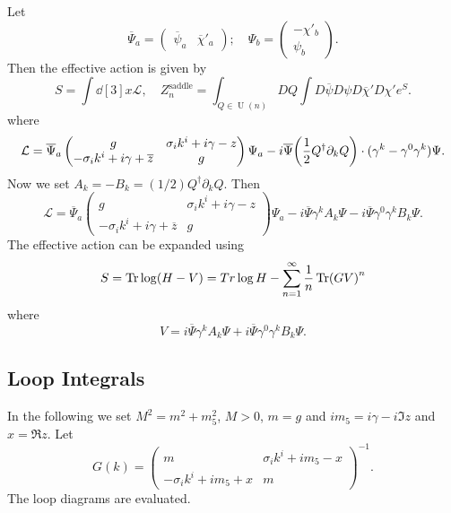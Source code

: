 \documentclass{article}
\begin{document}
Let
\[ \overline{\Psi}_a = \begin{pmatrix}
    \overline{\psi}_a & \overline{\chi}'_a
\end{pmatrix};\quad \Psi_b = \begin{pmatrix}
    -\chi'_b \\ \psi_b 
\end{pmatrix}. \]
Then the effective action is given by
\[ S = \int \dd[3]{x} \mathcal{L}, \quad Z_n^{\text{saddle}} = \int_{Q\in \operatorname{U}(n)} DQ \int D{\overline{\psi}}D{{\psi}}D{\overline{\chi}'}D{{\chi}'} e^S. \]
where
\[ \mathcal{L} = \overline{\Psi}_a \begin{pmatrix}
    g & \sigma_i k^i + i\gamma - z \\
    -\sigma_i k^i + i\gamma + \overline{z} & g
\end{pmatrix} \Psi_a - i\overline{\Psi} \qty(\frac{1}{2} Q^\dagger \partial_k Q) \cdot (\gamma^k - \gamma^0 \gamma^k) \Psi. \]
Now we set $A_k = -B_k = (1/2) Q^\dagger \partial_k Q$.
Then
\[ \mathcal{L} = \overline{\Psi}_a \begin{pmatrix}
    g & \sigma_i k^i + i\gamma - z \\
    -\sigma_i k^i + i\gamma + \overline{z} & g
\end{pmatrix} \Psi_a - i\overline{\Psi} \gamma^k A_k \Psi - i\overline{\Psi} \gamma^0 \gamma^k B_k \Psi. \]
The effective action can be expanded using
\[ S = \Tr \log (H - V) = Tr\log H - \sum_{n=1}^\infty \frac{1}{n} \Tr(G V)^n \]
where
\[ V = i\overline{\Psi} \gamma^k A_k \Psi + i\overline{\Psi} \gamma^0 \gamma^k B_k \Psi. \]

\subsection{Loop Integrals}

In the following we set $M^2 = m^2 + m_5^2$, $M>0$, $m = g$ and $im_5 = i\gamma - i \Im z$ and $x = \Re z$.
Let
\[ G(k) = \begin{pmatrix}
    m & \sigma_i k^i + im_5 - x \\
    -\sigma_i k^i + im_5 + x & m
\end{pmatrix}^{-1}. \]
The loop diagrams are evaluated.
\end{document}
